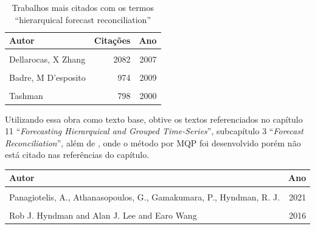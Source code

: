\documentclass[
  12pt,
  oneside,
  a4paper,
  chapter=TITLE,
  section=TITLE,
  brazil]{abntex2}
\begin{document}
\begin{table}
\caption{Trabalhos mais citados com os termos ``hierarquical forecast
reconciliation''}\tabularnewline

\centering\begingroup\fontsize{10}{12}\selectfont

\begin{tabular}[t]{lrr}
\toprule
Autor & Citações & Ano\\
\midrule
\cellcolor{gray!6}{Hyndman, G Athanasopoulos} & \cellcolor{gray!6}{5222} & \cellcolor{gray!6}{2018}\\
Dellarocas, X Zhang & 2082 & 2007\\
\cellcolor{gray!6}{Hyndman, A Lee, E Wang, S Wickramasuriya} & \cellcolor{gray!6}{1023} & \cellcolor{gray!6}{2013}\\
Badre, M D'esposito & 974 & 2009\\
\cellcolor{gray!6}{Hong, S Fan} & \cellcolor{gray!6}{912} & \cellcolor{gray!6}{2016}\\
\addlinespace
Tashman & 798 & 2000\\
\bottomrule
\end{tabular}
\endgroup{}
\end{table}

Utilizando essa obra como texto base, obtive os textos referenciados no
capítulo 11 ``\emph{Forecasting Hierarquical and Grouped Time-Series}'',
subcapítulo 3 ``\emph{Forecast Reconciliation}'', além de
\textcite{hyndman2016}, onde o método por MQP foi desenvolvido porém não
está citado nas referências do capítulo.

\begin{quadro}
\caption{Artigos de referência em Hyndman e Athanasopoulos (2021)}\tabularnewline

\centering\begingroup\fontsize{10}{12}\selectfont

\begin{tabular}[t]{lr}
\toprule
Autor & Ano\\
\midrule
\cellcolor{gray!6}{Hyndman, R. J., Ahmed, R. A., Athanasopoulos, G., Shang, H. L.} & \cellcolor{gray!6}{2011}\\
Panagiotelis, A., Athanasopoulos, G., Gamakumara, P., Hyndman, R. J. & 2021\\
\cellcolor{gray!6}{Wickramasuriya, S. L., Athanasopoulos, G., Hyndman, R. J.} & \cellcolor{gray!6}{2019}\\
Rob J. Hyndman and Alan J. Lee and Earo Wang & 2016\\
\bottomrule
\end{tabular}
\endgroup{}
\end{quadro}
\end{document}
